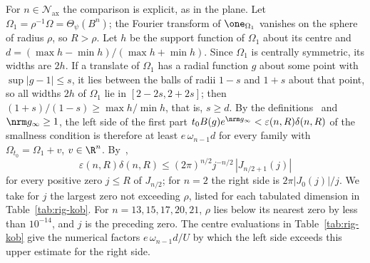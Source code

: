 For $n\in\mathcal N_{\mathrm{ax}}$ the comparison is explicit, as in the plane. Let $\Omega_1=\rho^{-1}\Omega=\Theta_\psi(B^n)$; the Fourier transform of $\one_{\Omega_1}$ vanishes on the sphere of radius $\rho$, so $R>\rho$. Let $h$ be the support function of $\Omega_1$ about its centre and $d=(\max h-\min h)/(\max h+\min h)$. Since $\Omega_1$ is centrally symmetric, its widths are $2h$. If a translate of $\Omega_1$ has a radial function $g$ about some point with $\sup|g-1|\leq s$, it lies between the balls of radii $1-s$ and $1+s$ about that point, so all widths $2h$ of $\Omega_1$ lie in $[2-2s,2+2s]$; then $(1+s)/(1-s)\geq\max h/\min h$, that is, $s\geq d$. By the definitions~\cite[(3.3.1), (3.3.2), (4.2.1)]{Kob93} and $\nrm g_\infty\geq1$, the left side of the first part $t_0B(g)e^{\nrm g_\infty}<\varepsilon(n,R)\delta(n,R)$ of the smallness condition is therefore at least $e\,\omega_{n-1}d$ for every family with $\Omega_{t_0}=\Omega_1+v$, $v\in\R^n$. By~\cite[(2.3.1), (2.3.3), (2.4.1)]{Kob93},
\[
 \varepsilon(n,R)\delta(n,R)\leq(2\pi)^{n/2}j^{-n/2}\,|J_{n/2+1}(j)|
\]
for every positive zero $j\leq R$ of $J_{n/2}$; for $n=2$ the right side is $2\pi|J_0(j)|/j$. We take for $j$ the largest zero not exceeding $\rho$, listed for each tabulated dimension in Table~\ref{tab:rig-kob}. For $n=13,15,17,20,21$, $\rho$ lies below its nearest zero by less than $10^{-14}$, and $j$ is the preceding zero. The centre evaluations in Table~\ref{tab:rig-kob} give the numerical factors $e\,\omega_{n-1}d/U$ by which the left side exceeds this upper estimate for the right side.

